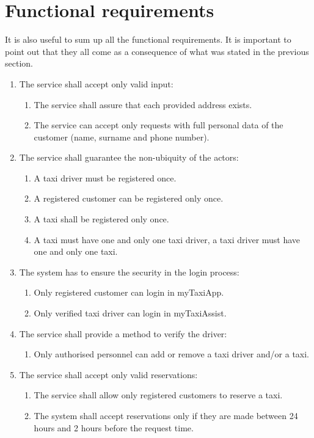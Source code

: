 \section{Functional requirements}
It is also useful to sum up all the functional requirements. It is important to point out that they all come as a consequence of what was stated in the previous section.


\begin{enumerate}
	\item The service shall accept only valid input: \begin{enumerate}
		\item The service shall assure that each provided address exists.
		\item The service can accept only requests with full personal data of the customer (name, surname and phone number).
	\end{enumerate}
	
	\item The service shall guarantee the non-ubiquity of the actors: \begin{enumerate}
		\item A taxi driver must be registered once.
		\item A registered customer can be registered only once.
		\item A taxi shall be registered only once.
		\item A taxi must have one and only one taxi driver, a taxi driver must have one and only one taxi.
	\end{enumerate}
	
	\item The system has to ensure the security in the login process: \begin{enumerate}
		\item Only registered customer can login in myTaxiApp.
		\item Only verified taxi driver can login in myTaxiAssist.
	\end{enumerate}
	
	\item The service shall provide a method to verify the driver: \begin{enumerate}
		\item Only authorised personnel can add or remove a taxi driver and/or a taxi.
	\end{enumerate}
	
	\item The service shall accept only valid reservations: \begin{enumerate}
		\item The service shall allow only registered customers to reserve a taxi.
		\item The system shall accept reservations only if they are made between 24 hours and 2 hours before the request time.
	\end{enumerate}
	

\end{enumerate}
